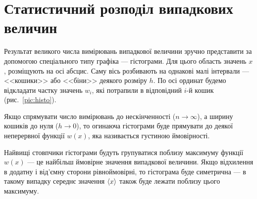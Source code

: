 \documentclass{LabBook}
\begin{document}
%
%
%


\section{Статистичний розподіл випадкових величин}

Результат великого числа вимірювань випадкової величини зручно представити за допомогою спеціального типу графіка --- гістограми. Для
цього область значень $x$, розміщують на осі абсцис. Саму вісь розбивають на однакові малі інтервали --- <<кошики>> або <<біни>>  деякого розміру $h$. По осі ординат будемо відкладати частку значень $w_i$, які потрапили в відповідний $i$-й кошик (рис.~\ref{pic:histo}).

Якщо спрямувати число вимірювань до нескінченності ($n \to \infty$), а ширину кошиків до нуля ($h \to 0$), то огинаюча гістограми буде прямувати до деякої неперервної функції $w(x)$, яка називається густиною ймовірності.

Найвищі стовпчики гістограми будуть групуватися поблизу максимуму функції $w(x)$ --- це найбільш ймовірне значення випадкової
величини. Якщо відхилення в додатну і від'ємну сторони рівноймовірні, то гістограма буде симетрична --- в такому випадку середнє значення $\left\langle x \right\rangle$ також буде лежати поблизу цього максимуму.
\end{document}
